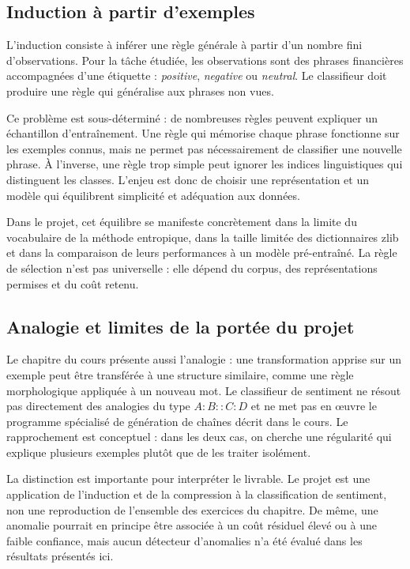 \documentclass[11pt,a4paper]{article}
\begin{document}
\subsection{Induction à partir d'exemples}
L'induction consiste à inférer une règle générale à partir d'un nombre fini
d'observations. Pour la tâche étudiée, les observations sont des phrases
financières accompagnées d'une étiquette : \emph{positive}, \emph{negative}
ou \emph{neutral}. Le classifieur doit produire une règle qui généralise aux
phrases non vues.

Ce problème est sous-déterminé : de nombreuses règles peuvent expliquer un
échantillon d'entraînement. Une règle qui mémorise chaque phrase fonctionne
sur les exemples connus, mais ne permet pas nécessairement de classifier une
nouvelle phrase. À l'inverse, une règle trop simple peut ignorer les indices
linguistiques qui distinguent les classes. L'enjeu est donc de choisir une
représentation et un modèle qui équilibrent simplicité et adéquation aux
données.

Dans le projet, cet équilibre se manifeste concrètement dans la limite du
vocabulaire de la méthode entropique, dans la taille limitée des dictionnaires
zlib et dans la comparaison de leurs performances à un modèle pré-entraîné.
La règle de sélection n'est pas universelle : elle dépend du corpus, des
représentations permises et du coût retenu.

\subsection{Analogie et limites de la portée du projet}
Le chapitre du cours présente aussi l'analogie : une transformation apprise
sur un exemple peut être transférée à une structure similaire, comme une
règle morphologique appliquée à un nouveau mot. Le classifieur de sentiment
ne résout pas directement des analogies du type $A:B::C:D$ et ne met pas en
œuvre le programme spécialisé de génération de chaînes décrit dans le cours.
Le rapprochement est conceptuel : dans les deux cas, on cherche une régularité
qui explique plusieurs exemples plutôt que de les traiter isolément.

La distinction est importante pour interpréter le livrable. Le projet est une
application de l'induction et de la compression à la classification de
sentiment, non une reproduction de l'ensemble des exercices du chapitre. De
même, une anomalie pourrait en principe être associée à un coût résiduel élevé
ou à une faible confiance, mais aucun détecteur d'anomalies n'a été évalué
dans les résultats présentés ici.
\end{document}

